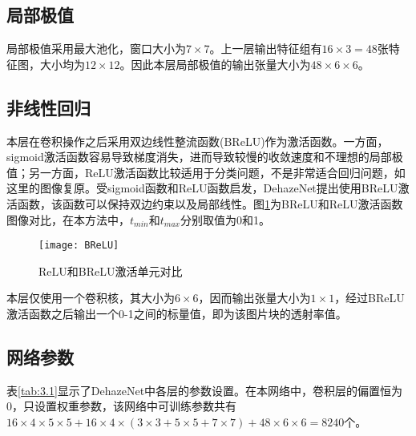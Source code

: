 \documentclass[a4paper, 12pt, oneside]{report}
\begin{document}
{\subsection{局部极值\quad}
局部极值采用最大池化，窗口大小为$7\times 7$。上一层输出特征组有$16 \times 3 = 48$张特征图，大小均为$12 \times 12$。因此本层局部极值的输出张量大小为$48 \times 6 \times 6$。

\subsection{非线性回归\quad}
本层在卷积操作之后采用双边线性整流函数(BReLU)作为激活函数。一方面，sigmoid激活函数容易导致梯度消失，进而导致较慢的收敛速度和不理想的局部极值；另一方面，ReLU激活函数比较适用于分类问题，不是非常适合回归问题，如这里的图像复原。受sigmoid函数和ReLU函数启发，DehazeNet提出使用BReLU激活函数，该函数可以保持双边约束以及局部线性。图\ref{fig:3.7}为BReLU和ReLU激活函数图像对比，在本方法中，$t_{min}$和$t_{max}$分别取值为0和1。

\begin{figure}[H]
\centering
\texttt{[image: BReLU]}
\caption{ReLU和BReLU激活单元对比}
\label{fig:3.7}
\end{figure}
本层仅使用一个卷积核，其大小为$6 \times 6$，因而输出张量大小为$1 \times 1$，经过BReLU激活函数之后输出一个0-1之间的标量值，即为该图片块的透射率值。

\subsection{网络参数\quad}
表\ref{tab:3.1}显示了DehazeNet中各层的参数设置。在本网络中，卷积层的偏置恒为0，只设置权重参数，该网络中可训练参数共有$16 \times 4 \times 5 \times 5 + 16 \times 4 \times (3 \times 3 + 5 \times 5 + 7 \times 7) + 48 \times 6 \times 6 = 8240$个。

}
\end{document}
